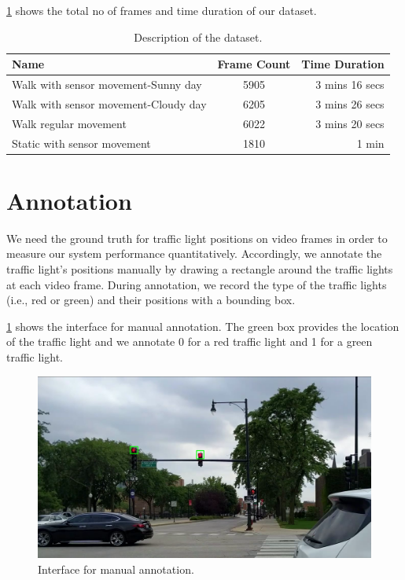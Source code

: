 \ref{t:dataset} shows the total no of frames and time duration of our dataset.

\begin{table}[h!]
  \centering
  \caption{Description of the dataset.}
  \label{t:dataset}
  \begin{tabular}{  l  c  r  }
   
    Name & Frame Count & Time Duration \\
    \hline
    Walk with sensor movement-Sunny day & 5905 & 3 mins 16 secs  \\
    Walk with sensor movement-Cloudy day & 6205 & 3 mins 26 secs \\
    Walk regular movement & 6022 & 3 mins 20 secs \\
    Static with sensor movement & 1810 & 1 min \\
    \hline
  \end{tabular}
\end{table}

\section{Annotation}
We need the ground truth for traffic light positions on video frames in order to measure our system performance quantitatively.
Accordingly, we annotate the traffic light's positions manually by drawing a rectangle around the traffic lights at each video frame.
During annotation, we record the type of the traffic lights (i.e., red or green) and their positions with a bounding box.

\ref{f:annotate} shows the interface for manual annotation.
The green box provides the location of the traffic light and we annotate 0 for a red traffic light and 1 for a green traffic light.

\begin{figure}[h!]
\centering
\includegraphics[width=5.2in]{images/annotation.png}
\caption{Interface for manual annotation.}
\label{f:annotate}
\end{figure}


